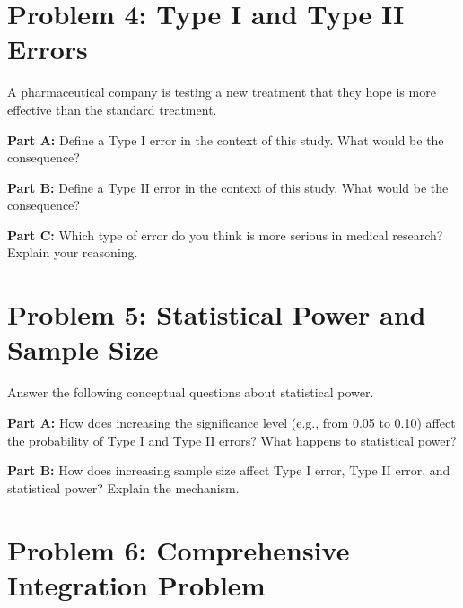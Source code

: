 \documentclass[11pt]{article}
\begin{document}
\vspace{3cm}

\newpage

\section{Problem 4: Type I and Type II Errors}

A pharmaceutical company is testing a new treatment that they hope is more effective than the standard treatment.

\vspace{6pt}

\textbf{Part A:} Define a Type I error in the context of this study. What would be the consequence?

\vspace{4cm}

\textbf{Part B:} Define a Type II error in the context of this study. What would be the consequence?

\vspace{4cm}

\textbf{Part C:} Which type of error do you think is more serious in medical research? Explain your reasoning.

\vspace{4cm}

\newpage

\section{Problem 5: Statistical Power and Sample Size}

Answer the following conceptual questions about statistical power.

\vspace{6pt}

\textbf{Part A:} How does increasing the significance level (e.g., from 0.05 to 0.10) affect the probability of Type I and Type II errors? What happens to statistical power?

\vspace{5cm}

\textbf{Part B:} How does increasing sample size affect Type I error, Type II error, and statistical power? Explain the mechanism.

\vspace{5cm}

\newpage

\section{Problem 6: Comprehensive Integration Problem}
\end{document}
